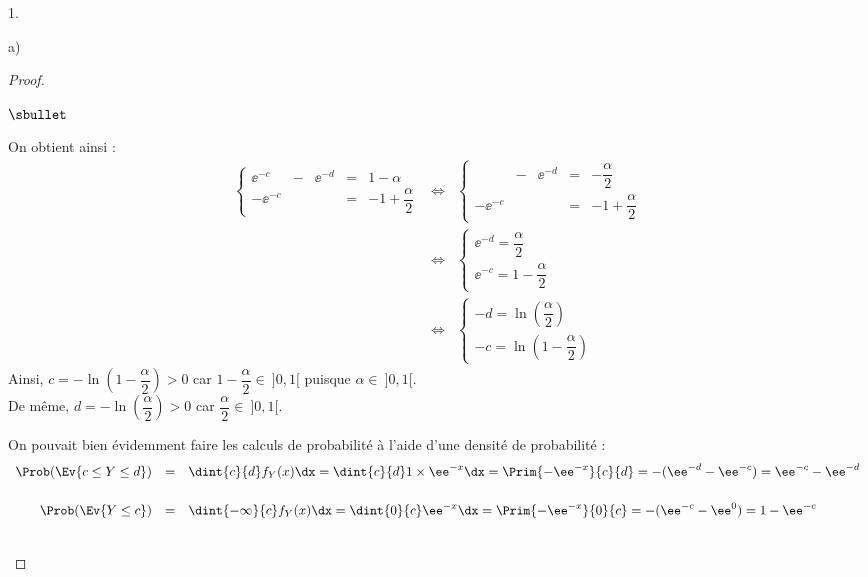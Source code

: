 \begin{noliste}{1.}
\begin{noliste}{a)}
\begin{proof}
\begin{noliste}{$\sbullet$}
      \item On obtient ainsi :
        \[
        \begin{array}{rcl}
          \left\{
            \begin{array}{ccccc}
              \ee^{-c} & - & \ee^{-d} & = & 1 - \alpha \\[.4cm]
              -\ee^{-c} & & & = & -1 + \dfrac{\alpha}{2}
            \end{array}
          \right. %
          & \Leftrightarrow &
          \left\{
            \begin{array}{ccccc}
              & - & \ee^{-d} & = & - \dfrac{\alpha}{2} \\[.4cm]
              - \ee^{-c} & & & = & -1 + \dfrac{\alpha}{2}
            \end{array}
          \right. \\[1cm]
          & \Leftrightarrow &
          \left\{
            \begin{array}{l}
              \ee^{-d} = \dfrac{\alpha}{2} \\[.4cm]
              \ee^{-c} = 1 - \dfrac{\alpha}{2}
            \end{array}
          \right. \\[1cm]
          & \Leftrightarrow &
          \left\{
            \begin{array}{l}
              -d = \ln\left( \dfrac{\alpha}{2} \right) \\[.4cm]
              -c = \ln\left(1 - \dfrac{\alpha}{2} \right)
            \end{array}
          \right.
        \end{array}
        \]
        Ainsi, $c = -\ln\left(1 - \dfrac{\alpha}{2} \right) > 0$ car
        $1 - \dfrac{\alpha}{2} \in \ ]0,1[$ puisque $\alpha \in \
        ]0,1[$.\\[.2cm]
        De même, $d = - \ln\left( \dfrac{\alpha}{2} \right) > 0$ car
        $\dfrac{\alpha}{2} \in \ ]0,1[$.
      \end{noliste}
      \conc{$c = -\ln\left(1 - \dfrac{\alpha}{2} \right)$ \quad et
        \quad $d = - \ln\left( \dfrac{\alpha}{2} \right)$}
      \begin{remarkL}{0.99}%
        On pouvait bien évidemment faire les calculs de probabilité à
        l'aide d'une densité de probabilité :
        \[
        \begin{array}{rcl}
          \Prob(\Ev{c\leq Y\leq d}) & = & \dint{c}{d} f_Y(x) \dx =
          \dint{c}{d} 1 \times \ee^{-x} \dx = \Prim{-\ee^{-x}}{c}{d} = -
          (\ee^{-d} - \ee^{-c}) = \ee^{-c} - \ee^{-d}
          \\[.6cm]
          \Prob(\Ev{Y \leq c}) & = & \dint{-\infty}{c} f_Y(x) \dx =
          \dint{0}{c} \ee^{-x} \dx = \Prim{-\ee^{-x}}{0}{c} = -(\ee^{-c}
          - \ee^{0}) = 1 - \ee^{-c}
        \end{array}
        \]
      \end{remarkL}~\\[-1.4cm]
    \end{proof}



\end{noliste}
\end{noliste}
